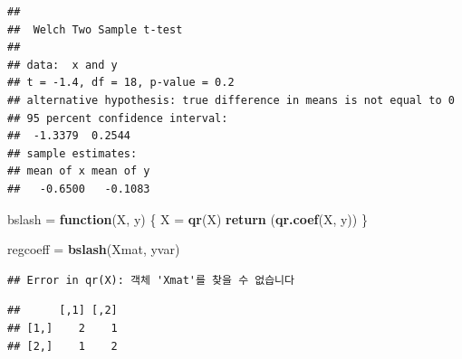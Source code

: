 \documentclass[10pt,]{krantz}
\makeatletter
\newenvironment{Shaded}{\begin{snugshade}}{\end{snugshade}}
\newcommand{\KeywordTok}[1]{\textcolor[rgb]{0.13,0.29,0.53}{\textbf{#1}}}
\newcommand{\DataTypeTok}[1]{\textcolor[rgb]{0.13,0.29,0.53}{#1}}
\newcommand{\DecValTok}[1]{\textcolor[rgb]{0.00,0.00,0.81}{#1}}
\newcommand{\FloatTok}[1]{\textcolor[rgb]{0.00,0.00,0.81}{#1}}
\newcommand{\StringTok}[1]{\textcolor[rgb]{0.31,0.60,0.02}{#1}}
\newcommand{\ControlFlowTok}[1]{\textcolor[rgb]{0.13,0.29,0.53}{\textbf{#1}}}
\newcommand{\OperatorTok}[1]{\textcolor[rgb]{0.81,0.36,0.00}{\textbf{#1}}}
\newcommand{\NormalTok}[1]{#1}
\newenvironment{kframe}{%
\medskip{}
\setlength{\fboxsep}{.8em}
 \def\at@end@of@kframe{}%
 \ifinner\ifhmode%
  \def\at@end@of@kframe{\end{minipage}}%
  \begin{minipage}{\columnwidth}%
 \fi\fi%
 \def\FrameCommand##1{\hskip\@totalleftmargin \hskip-\fboxsep
 \colorbox{shadecolor}{##1}\hskip-\fboxsep
     \hskip-\linewidth \hskip-\@totalleftmargin \hskip\columnwidth}%
 \MakeFramed {\advance\hsize-\width
   \@totalleftmargin\z@ \linewidth\hsize
   \@setminipage}}%
 {\par\unskip\endMakeFramed%
 \at@end@of@kframe}
\renewenvironment{Shaded}{\begin{kframe}}{\end{kframe}}
\makeatother
\begin{document}
\begin{verbatim}
## 
##  Welch Two Sample t-test
## 
## data:  x and y
## t = -1.4, df = 18, p-value = 0.2
## alternative hypothesis: true difference in means is not equal to 0
## 95 percent confidence interval:
##  -1.3379  0.2544
## sample estimates:
## mean of x mean of y 
##   -0.6500   -0.1083
\end{verbatim}

\begin{Shaded}
\begin{Highlighting}[]
\NormalTok{bslash =}\StringTok{ }\ControlFlowTok{function}\NormalTok{(X, y) }
\NormalTok{\{}
\NormalTok{  X =}\StringTok{ }\KeywordTok{qr}\NormalTok{(X)}
  \KeywordTok{return}\NormalTok{ (}\KeywordTok{qr.coef}\NormalTok{(X, y))}
\NormalTok{\}}

\NormalTok{regcoeff =}\StringTok{ }\KeywordTok{bslash}\NormalTok{(Xmat, yvar)}
\end{Highlighting}
\end{Shaded}

\begin{verbatim}
## Error in qr(X): 객체 'Xmat'를 찾을 수 없습니다
\end{verbatim}

\begin{Shaded}
\end{Shaded}

\begin{verbatim}
##      [,1] [,2]
## [1,]    2    1
## [2,]    1    2
\end{verbatim}

\begin{Shaded}
\end{Shaded}
\end{document}
